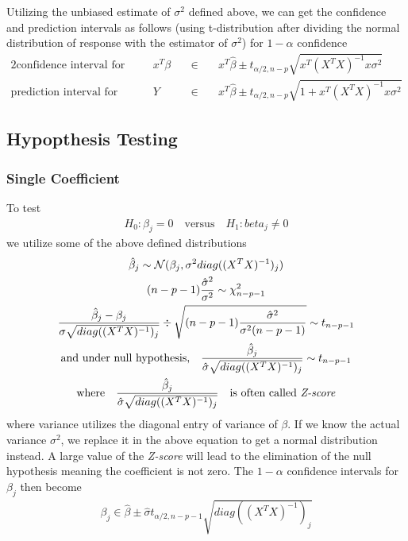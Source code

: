 \documentclass[../statistical_learning_notes.tex]{subfiles}
\begin{document}
Utilizing the unbiased estimate of $\sigma^{2}$ defined above, we can get the confidence and prediction intervals as follows (using t-distribution after dividing the normal distribution of response with the estimator of $\sigma^{2}$) for $1-\alpha$ confidence
\begin{alignat*}{2}
    \text{confidence interval for mean response} \quad &x^{T}\beta \quad &\in \quad &x^{T}\hat{\beta} \pm t_{\alpha/2, n-p} \sqrt{x^{T}(X^{T}X)^{-1}x \sigma^{2}}\\
    \text{prediction interval for response} \quad &Y \quad &\in \quad &x^{T}\hat{\beta} \pm t_{\alpha/2, n-p} \sqrt{1 + x^{T}(X^{T}X)^{-1}x \sigma^{2}}
\end{alignat*}


\subsection{Hypopthesis Testing}
\subsubsection{Single Coefficient}
To test
\begin{align*}
    H_{0}: \beta_{j} = 0 \quad \text{versus} \quad H_{1}: beta_{j} \neq 0
\end{align*}
we utilize some of the above defined distributions
\begin{gather*}
    \hat{\beta}_{j} \sim \mathcal{N}(\beta_{j}, \sigma^{2}diag((X^{T}X)^{-1})_{j})\\
    (n - p - 1) \frac{\hat{\sigma}^{2}}{\sigma^{2}} \sim \chi_{n-p-1}^{2}\\
    \frac{\hat{\beta}_{j} - \beta_{j}}{\sigma\sqrt{diag((X^{T}X)^{-1})_{j}}} \div \sqrt{(n - p - 1) \frac{\hat{\sigma}^{2}}{\sigma^{2}(n-p-1)}} \sim t_{n-p-1}\\
    \text{and under null hypothesis,} \quad \frac{\hat{\beta}_{j}}{\hat{\sigma}\sqrt{diag((X^{T}X)^{-1})_{j}}} \sim t_{n-p-1}\\
    \text{where} \quad \frac{\hat{\beta}_{j}}{\hat{\sigma}\sqrt{diag((X^{T}X)^{-1})_{j}}} \quad \text{is often called \emph{Z-score}}
\end{gather*}
where variance utilizes the diagonal entry of variance of $\beta$. If we know the actual variance $\sigma^{2}$, we replace it in the above equation to get a normal distribution instead. A large value of the \emph{Z-score} will lead to the elimination of the null hypothesis meaning the coefficient is not zero. The $1-\alpha$ confidence intervals for $\beta_{j}$ then become
\begin{gather*}
    \beta_{j} \in \hat{\beta} \pm \hat{\sigma} t_{\alpha/2, n-p-1} \sqrt{diag((X^{T}X)^{-1})_{j}}
\end{gather*}
\end{document}
